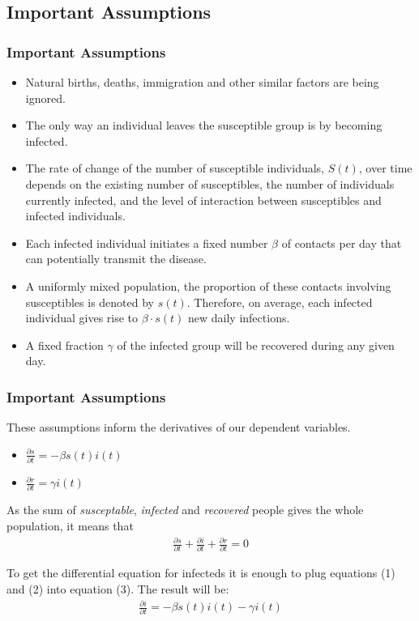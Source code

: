\documentclass{beamer}
\begin{document}
\subsection{Important Assumptions}
\begin{frame}\frametitle{Important Assumptions}
    \begin{itemize}
        \item Natural births, deaths, immigration and other similar factors are being ignored.
        \item The only way an individual leaves the susceptible group is by becoming infected.
        \item The rate of change of the number of susceptible individuals, $S(t)$, over time depends on the existing number of susceptibles, the number of individuals currently infected, and the level of interaction between susceptibles and infected individuals.
        \item Each infected individual initiates a fixed number $\beta$ of contacts per day that can potentially transmit the disease.
        \item A uniformly mixed population, the proportion of these contacts involving susceptibles is denoted by $s(t)$. Therefore, on average, each
infected individual gives rise to $\beta \cdot s(t)$ new daily infections.
        \item A fixed fraction $\gamma$ of the infected group will be recovered during any given day.
    \end{itemize}
\end{frame}

\begin{frame}[t]\frametitle{Important Assumptions}
These assumptions inform the derivatives of our dependent variables.
    \begin{itemize}
        \item $\frac{\partial{s}}{\partial{t}}=-\beta s(t)i(t)$
        \item $\frac{\partial{r}}{\partial{t}}=\gamma i(t)$
    \end{itemize}
As  the sum of \textit{susceptable}, \textit{infected} and \textit{recovered} people gives the whole population, it means that
\begin{align}
    \frac{\partial{s}}{\partial{t}}+\frac{\partial{i}}{\partial{t}}+\frac{\partial{r}}{\partial{t}}=0
\end{align}

To get the differential equation for infecteds it is enough to plug equations (1) and (2)
into equation (3). The result will be:
    \begin{align}
        \frac{\partial{i}}{\partial{t}}=-\beta s(t)i(t)-\gamma i(t)
    \end{align}
\end{frame}
\end{document}

